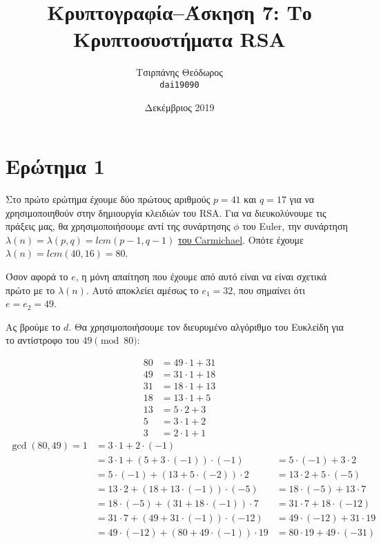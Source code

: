 \documentclass{article}
\title{Κρυπτογραφία--Άσκηση 7: Το Κρυπτοσυστήματα RSA}
\author{Τσιρπάνης Θεόδωρος\\ \texttt{dai19090}}
\date{Δεκέμβριος 2019}
\begin{document}

\maketitle

\section*{Ερώτημα 1}

Στο πρώτο ερώτημα έχουμε δύο πρώτους αριθμούς $p = 41$ και $q = 17$ για να χρησιμοποιηθούν στην δημιουργία κλειδιών του RSA. Για να διευκολύνουμε τις πράξεις μας, θα χρησιμοποιήσουμε αντί της συνάρτησης $\phi$ του Euler, την συνάρτηση $\lambda(n) = \lambda(p, q) = lcm(p - 1, q - 1)$ \href{https://en.wikipedia.org/wiki/RSA_(cryptosystem)#Key_generation}{του Carmichael}. Οπότε έχουμε $\lambda(n) = lcm(40, 16) = 80$.

Όσον αφορά το $e$, η μόνη απαίτηση που έχουμε από αυτό είναι να είναι σχετικά πρώτο με το $\lambda(n)$. Αυτό αποκλείει αμέσως το $e_1 = 32$, που σημαίνει ότι $e = e_2 = 49$.

Ας βρούμε το $d$. Θα χρησιμοποιήσουμε τον διευρυμένο αλγόριθμο του Ευκλείδη για το αντίστροφο του $49 \pmod {80}$:

\begin{align*}
80 &= 49 \cdot 1 + 31 \\
49 &= 31 \cdot 1 + 18 \\
31 &= 18 \cdot 1 + 13 \\
18 &= 13 \cdot 1 + 5 \\
13 &= 5 \cdot 2 + 3 \\
5 &= 3 \cdot 1 + 2 \\
3 &= 2 \cdot 1 + 1
\end{align*}
\begin{align*}
\gcd(80, 49) = 1
&= 3 \cdot 1 + 2 \cdot (-1) \\
&= 3 \cdot 1 + (5 + 3 \cdot (-1)) \cdot (-1) &= 5 \cdot (-1) + 3 \cdot 2 \\
&= 5 \cdot (-1) + (13 + 5 \cdot (-2)) \cdot 2 &= 13 \cdot 2 + 5 \cdot (-5) \\
&= 13 \cdot 2 + (18 + 13 \cdot (-1)) \cdot (-5) &= 18 \cdot (-5) + 13 \cdot 7 \\
&= 18 \cdot (-5) + (31 + 18 \cdot (-1)) \cdot 7 &= 31 \cdot 7 + 18 \cdot (-12) \\
&= 31 \cdot 7 + (49 + 31 \cdot (-1)) \cdot (-12) &= 49 \cdot (-12) + 31 \cdot 19 \\
&= 49 \cdot (-12) + (80 + 49 \cdot (-1)) \cdot 19 &= 80 \cdot 19 + 49 \cdot (-31)
\end{align*}
\end{document}
